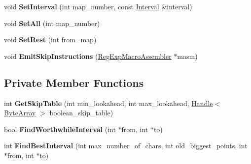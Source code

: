 \begin{DoxyCompactItemize}
\item 
void {\bfseries Set\+Interval} (int map\+\_\+number, const \hyperlink{classv8_1_1internal_1_1_interval}{Interval} \&interval)\hypertarget{classv8_1_1internal_1_1_boyer_moore_lookahead_a10f6403132f37e64c3ea5b02e1476b1c}{}\label{classv8_1_1internal_1_1_boyer_moore_lookahead_a10f6403132f37e64c3ea5b02e1476b1c}

\item 
void {\bfseries Set\+All} (int map\+\_\+number)\hypertarget{classv8_1_1internal_1_1_boyer_moore_lookahead_a36418e6a797298179b6386f16462b7d8}{}\label{classv8_1_1internal_1_1_boyer_moore_lookahead_a36418e6a797298179b6386f16462b7d8}

\item 
void {\bfseries Set\+Rest} (int from\+\_\+map)\hypertarget{classv8_1_1internal_1_1_boyer_moore_lookahead_aa0c55e2cb8b8bb1c6781fead233fb37f}{}\label{classv8_1_1internal_1_1_boyer_moore_lookahead_aa0c55e2cb8b8bb1c6781fead233fb37f}

\item 
void {\bfseries Emit\+Skip\+Instructions} (\hyperlink{classv8_1_1internal_1_1_reg_exp_macro_assembler}{Reg\+Exp\+Macro\+Assembler} $\ast$masm)\hypertarget{classv8_1_1internal_1_1_boyer_moore_lookahead_ade25cef1e93047f545c040b8b1af156d}{}\label{classv8_1_1internal_1_1_boyer_moore_lookahead_ade25cef1e93047f545c040b8b1af156d}

\end{DoxyCompactItemize}
\subsection*{Private Member Functions}
\begin{DoxyCompactItemize}
\item 
int {\bfseries Get\+Skip\+Table} (int min\+\_\+lookahead, int max\+\_\+lookahead, \hyperlink{classv8_1_1internal_1_1_handle}{Handle}$<$ \hyperlink{classv8_1_1internal_1_1_byte_array}{Byte\+Array} $>$ boolean\+\_\+skip\+\_\+table)\hypertarget{classv8_1_1internal_1_1_boyer_moore_lookahead_a04a97e98e560a43806bb7f57bb1ef511}{}\label{classv8_1_1internal_1_1_boyer_moore_lookahead_a04a97e98e560a43806bb7f57bb1ef511}

\item 
bool {\bfseries Find\+Worthwhile\+Interval} (int $\ast$from, int $\ast$to)\hypertarget{classv8_1_1internal_1_1_boyer_moore_lookahead_ac9f50793c7f87b4549585139b0a39b2f}{}\label{classv8_1_1internal_1_1_boyer_moore_lookahead_ac9f50793c7f87b4549585139b0a39b2f}

\item 
int {\bfseries Find\+Best\+Interval} (int max\+\_\+number\+\_\+of\+\_\+chars, int old\+\_\+biggest\+\_\+points, int $\ast$from, int $\ast$to)\hypertarget{classv8_1_1internal_1_1_boyer_moore_lookahead_add0442f473b80d85577c0742c370741a}{}\label{classv8_1_1internal_1_1_boyer_moore_lookahead_add0442f473b80d85577c0742c370741a}

\end{DoxyCompactItemize}
